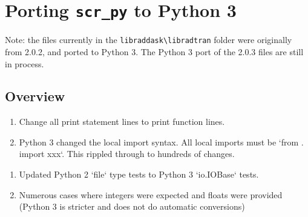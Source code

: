 \chapter{Porting \texttt{scr\_py} to Python 3}
\label{chap:Portingscr_pytoPython3}

Note: the files currently in the 
\lstinline{libraddask\libradtran}
folder were originally from \libradtran{} 2.0.2, and ported to Python 3.
The Python 3 port of the \libradtran{} 2.0.3 files are still in process.

\section{Overview}
\label{sec:Portingscr_pytoPython3}

\begin{enumerate}
\item Change all print statement lines to print function lines.

\item Python 3 changed the local import syntax. All local imports must be `from . import xxx`. This rippled through to hundreds of changes.



\end{enumerate}


\begin{enumerate}



\item Updated Python 2 `file` type tests to Python 3 `io.IOBase` tests.

\item Numerous cases where integers were expected and floats were provided (Python 3 is stricter and does not do automatic conversions)

\end{enumerate}


